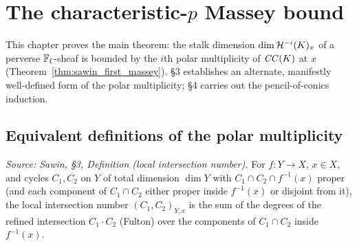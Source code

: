\section{The characteristic-$p$ Massey bound}


This chapter proves the main theorem: the stalk dimension $\dim \mathcal{H}^{-i}(K)_x$ of
a perverse $\mathbb{F}_\ell$-sheaf is bounded by the $i$th polar multiplicity of
$\mathit{CC}(K)$ at $x$ (Theorem~\ref{thm:sawin_first_massey}).  §3 establishes an
alternate, manifestly well-defined form of the polar multiplicity; §4 carries
out the pencil-of-conics induction.

\subsection{Equivalent definitions of the polar multiplicity}

\begin{definition}
  \label{def:sawin_local_intersection}
  \textit{Source: Sawin, §3, Definition (local intersection number).}
  For $f:Y\to X$, $x\in X$, and cycles $C_1,C_2$ on $Y$ of total dimension
  $\dim Y$ with $C_1\cap C_2\cap f^{-1}(x)$ proper (and each component of
  $C_1\cap C_2$ either proper inside $f^{-1}(x)$ or disjoint from it), the local
  intersection number $(C_1,C_2)_{Y,x}$ is the sum of the degrees of the refined
  intersection $C_1\cdot C_2$ (Fulton) over the components of $C_1\cap C_2$
  inside $f^{-1}(x)$.
\end{definition}


